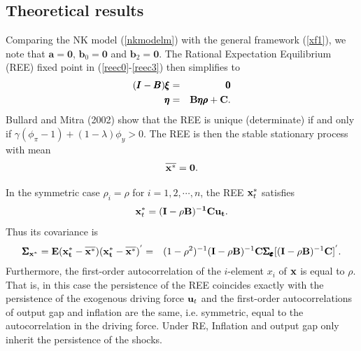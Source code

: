 \subsection{Theoretical results}
Comparing the NK model (\ref{nkmodelm}) with the general framework (\ref{xf1}), we note that $\pmb{a}={\pmb 0}$, $\pmb{b}_0={\pmb 0}$ and $\pmb{b}_2={\pmb 0}$.
The Rational Expectation Equilibrium (REE) fixed point in (\ref{reec0}-\ref{reec3}) then simplifies to
\begin{eqnarray}
({\pmb I}-{\pmb B}){\pmb \xi}&=&\pmb 0\\
{\pmb \eta}&=&{\bf B}{\pmb\eta \pmb \rho}+{\bf C}.
\end{eqnarray}
Bullard and Mitra (2002) show that the REE is unique (determinate) if and only if $\gamma(\phi_{\pi}-1)+(1-\lambda)\phi_y>0$. The REE is then the stable stationary process with mean
\begin{eqnarray}\label{xstarnk}
\overline{{\bf x}^*}=\bf 0.
\end{eqnarray}


In the symmetric case $\rho_i=\rho$ for $i=1,2,\cdots,n$, the REE ${\bf x}_t^*$ satisfies
\begin{eqnarray}\label{xstar0nk}
{\bf x}_t^*=(\bf I-\rho{\bf B})^{-1}{\bf C}{\bf u}_t.
\end{eqnarray}
Thus its covariance is
\begin{eqnarray}\label{mxreevnk}
\pmb\Sigma_{\bf x^*} =\bf{E(x^*_t-\overline{x^*})(x^*_t-\overline{x^*})^{'}}&=&{(1-\rho^2)^{-1}}({\bf I}-\rho{\bf B})^{-1}{\bf C}\pmb{\Sigma_{\pmb\varepsilon}}[({\bf I}-\rho{\bf B})^{-1}{\bf C}]^{'}.
\end{eqnarray}
Furthermore, the first-order autocorrelation of the $i$-element $x_i$ of $\bf x$ is equal to $\rho$.
That is, in this case the persistence of the REE
coincides exactly with the persistence of the exogenous driving
force ${\bf u}_t$ and the first-order autocorrelations of output gap and inflation are the same, i.e. symmetric, equal to the autocorrelation in the driving force. Under RE, Inflation and output gap only inherit the persistence of the shocks.

